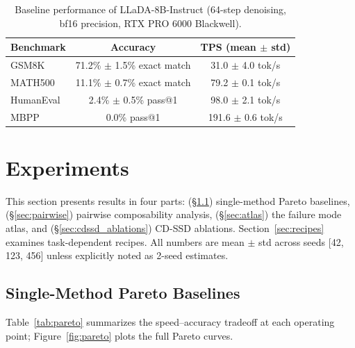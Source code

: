 \documentclass{article}
\begin{document}
\begin{table}[h]
\centering
\small
\begin{tabular}{lcc}
\toprule
\textbf{Benchmark} & \textbf{Accuracy} & \textbf{TPS (mean $\pm$ std)} \\
\midrule
GSM8K & 71.2\% $\pm$ 1.5\% exact match & 31.0 $\pm$ 4.0 tok/s \\
MATH500 & 11.1\% $\pm$ 0.7\% exact match & 79.2 $\pm$ 0.1 tok/s \\
HumanEval & 2.4\% $\pm$ 0.5\% pass@1 & 98.0 $\pm$ 2.1 tok/s \\
MBPP & 0.0\% pass@1 & 191.6 $\pm$ 0.6 tok/s \\
\bottomrule
\end{tabular}
\caption{Baseline performance of LLaDA-8B-Instruct (64-step denoising, bf16 precision, RTX PRO 6000
Blackwell).}
\label{tab:baseline}
\end{table}

\section{Experiments}
\label{sec:experiments}

This section presents results in four parts: (\S\ref{sec:pareto}) single-method Pareto baselines,
(\S\ref{sec:pairwise}) pairwise composability analysis, (\S\ref{sec:atlas}) the failure mode atlas,
and (\S\ref{sec:cdssd_ablations}) CD-SSD ablations. Section~\ref{sec:recipes} examines
task-dependent recipes. All numbers are mean $\pm$ std across seeds [42, 123, 456] unless explicitly
noted as 2-seed estimates.

\subsection{Single-Method Pareto Baselines}
\label{sec:pareto}

Table~\ref{tab:pareto} summarizes the speed--accuracy tradeoff at each operating point; Figure~\ref{fig:pareto} plots the full Pareto curves.
\end{document}
